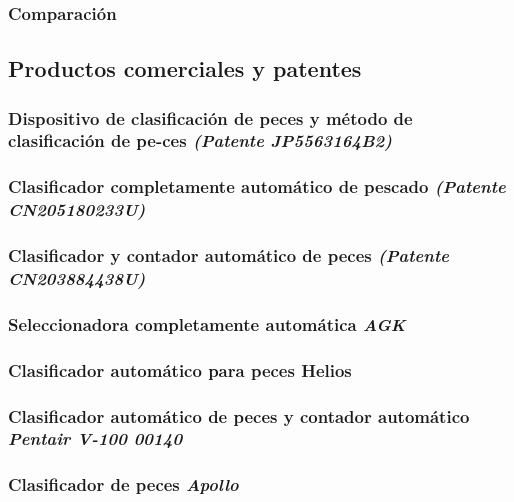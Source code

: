 \subsubsection{Comparación}

\subsection{Productos comerciales y patentes}

\subsubsection{Dispositivo de clasificación de peces y método de clasificación de pe-ces \textit{(Patente JP5563164B2)}}

\subsubsection{Clasificador completamente automático de pescado \textit{(Patente CN205180233U)}}

\subsubsection{Clasificador y contador automático de peces \textit{(Patente CN203884438U)}}

\subsubsection{Seleccionadora completamente automática \textit{AGK}}

\subsubsection{Clasificador automático para peces Helios}

\subsubsection{Clasificador automático de peces y contador automático \textit{Pentair V-100 00140}}

\subsubsection{Clasificador de peces \textit{Apollo}}

